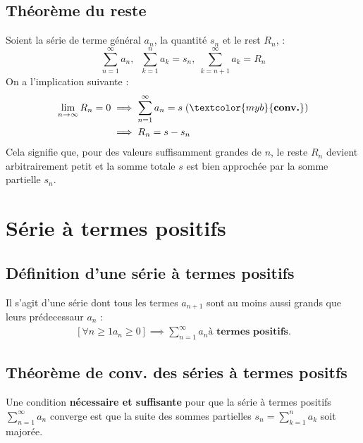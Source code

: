 \documentclass{report}
\begin{document}
\begin{multicols*}{3}
    \section{Théorème du reste}

        Soient la série de terme général $a_n$, la quantité $s_n$ et le rest $R_n$, :
        \[%
        \sum_{n=1}^{\infty }a_n, \;\;
        \sum_{k=1}^{n }a_k = s_n, \; \sum_{k= n+1}^{\infty }a_k = R_n
        \]%
        On a l'implication suivante :
        \begin{align*}
            \lim\limits_{n\to\infty }R_n = 0 
            &\implies \sum_{n=1}^{\infty }a_n = s \; (\textcolor{myb}{\textbf{conv.}})  \\
            &\implies R_n = s - s_n 
        \end{align*}
        Cela signifie que, pour des valeurs suffisamment grandes de \(n\), 
        le reste \(R_n\) devient 
        arbitrairement petit et la somme totale \(s\) est bien approchée 
        par la somme partielle \(s_n\).    


\chapter{Série à termes positifs}


    \section{Définition d'une série à termes positifs}
    Il s'agit d'une série dont tous les termes $a_{n+1}$ sont au moins aussi grands 
    que  leurs prédecessaur $a_n$ : 
    \begin{align*}
        \left[ \forall n \geq 1 a_n \geq 0 \right] \implies \sum_{n=1}^{\infty }a_n 
     \textbf{à termes positifs}.
    \end{align*}
    
                

    \section{Théorème de conv. des séries à termes positfs}
    Une condition \textbf{nécessaire et suffisante} pour que la série à termes positifs 
        $\sum_{n=1}^{\infty }a_n$ converge est que la suite des sommes partielles
        $s_n = \sum_{k=1}^{n }a_k$ soit majorée. 
        \\\\ 


\end{multicols*}
\end{document}
